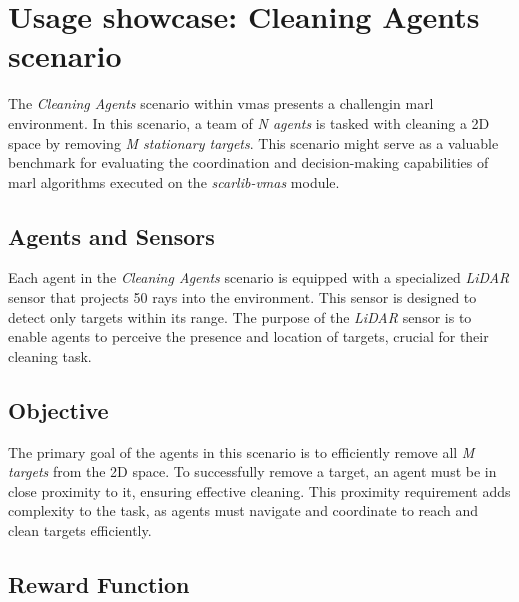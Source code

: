 \documentclass[12pt,a4paper,openright,twoside]{book}
\begin{document}
\section{Usage showcase: Cleaning Agents scenario}

The \emph{Cleaning Agents} scenario within \ac{vmas} presents a challengin \ac{marl} environment. In this scenario, a team of \emph{N agents} is tasked with cleaning a 2D space by removing \emph{M stationary targets}. This scenario might serve as a valuable benchmark for evaluating the coordination and decision-making capabilities of \ac{marl} algorithms executed on the \emph{scarlib-vmas} module.

\subsection{Agents and Sensors}

Each agent in the \emph{Cleaning Agents} scenario is equipped with a specialized \emph{LiDAR} sensor that projects 50 rays into the environment.
This sensor is designed to detect only targets within its range.
The purpose of the \emph{LiDAR} sensor is to enable agents to perceive the presence and location of targets, crucial for their cleaning task.

\subsection{Objective}

The primary goal of the agents in this scenario is to efficiently remove all \emph{M targets} from the 2D space. To successfully remove a target, an agent must be in close proximity to it, ensuring effective cleaning. This proximity requirement adds complexity to the task, as agents must navigate and coordinate to reach and clean targets efficiently.

\subsection{Reward Function}
\end{document}
